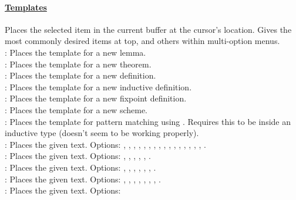 \paragraph{\underline{Templates}}
Places the selected item in the current buffer at the cursor's location. 
Gives the most commonly desired items at top, and others within multi-option menus. 
~\\
 : Places the template for a new lemma. 
\\
 : Places the template for a new theorem. 
\\
 : Places the template for a new definition. 
\\
 : Places the template for a new inductive definition. 
\\
 : Places the template for a new fixpoint definition. 
\\
 : Places the template for a new scheme. 
\\
 : Places the template for pattern matching using . 
	Requires this to be inside an inductive type (doesn't seem to be working properly). 
\\
 : Places the given text. Options: 
	, 
	, 
	, , , , 
	, , , 
	, , , 
	, 
	, 
	, , . 
\\
 : Places the given text. Options: 
	, , , , 
	, . 
\\
 : Places the given text. Options: 
	, , , , 
	, , .
\\
 : Places the given text. Options: 
	, , , , , 
	, , . 
\\
 : Places the given text. Options: 
